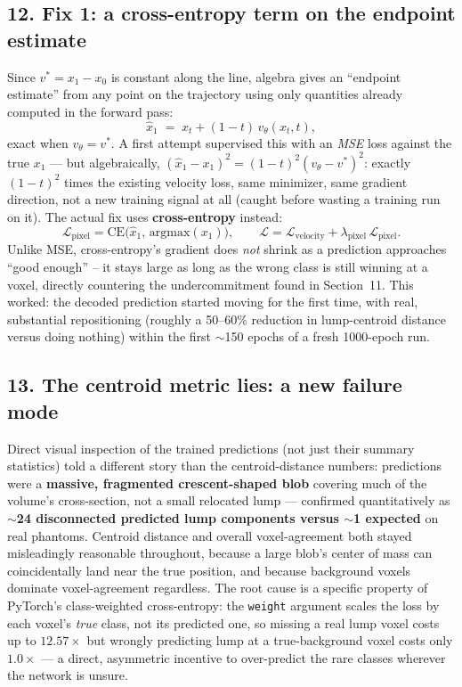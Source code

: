 \documentclass[11pt]{article}
\newcommand{\hsub}[1]{\subsection*{#1}}
\begin{document}
\hsub{12. Fix 1: a cross-entropy term on the endpoint estimate}
Since $v^* = x_1-x_0$ is constant along the line, algebra gives an ``endpoint estimate'' from
any point on the trajectory using only quantities already computed in the forward pass:
\begin{equation}
\hat x_1 \;=\; x_t + (1-t)\,v_\theta(x_t,t), \label{eq:endpoint-estimate}
\end{equation}
exact when $v_\theta = v^*$. A first attempt supervised this with an \emph{MSE} loss against
the true $x_1$ --- but algebraically, $(\hat x_1 - x_1)^2 = (1-t)^2(v_\theta - v^*)^2$: exactly
$(1-t)^2$ times the existing velocity loss, same minimizer, same gradient direction, not a new
training signal at all (caught before wasting a training run on it). The actual fix uses
\textbf{cross-entropy} instead:
\begin{equation}
\mathcal{L}_{\text{pixel}} = \text{CE}\big(\hat x_1,\, \text{argmax}(x_1)\big), \qquad
\mathcal{L} = \mathcal{L}_{\text{velocity}} + \lambda_{\text{pixel}}\,\mathcal{L}_{\text{pixel}}.
\label{eq:pixel-loss}
\end{equation}
Unlike MSE, cross-entropy's gradient does \emph{not} shrink as a prediction approaches
``good enough'' -- it stays large as long as the wrong class is still winning at a voxel,
directly countering the undercommitment found in Section~11. This worked: the decoded
prediction started moving for the first time, with real, substantial repositioning (roughly a
50--60\% reduction in lump-centroid distance versus doing nothing) within the first $\sim$150
epochs of a fresh 1000-epoch run.

\hsub{13. The centroid metric lies: a new failure mode}
Direct visual inspection of the trained predictions (not just their summary statistics) told
a different story than the centroid-distance numbers: predictions were a \textbf{massive,
fragmented crescent-shaped blob} covering much of the volume's cross-section, not a small
relocated lump --- confirmed quantitatively as \textbf{$\sim$24 disconnected predicted lump
components versus $\sim$1 expected} on real phantoms. Centroid distance and overall
voxel-agreement both stayed misleadingly reasonable throughout, because a large blob's center
of mass can coincidentally land near the true position, and because background voxels
dominate voxel-agreement regardless. The root cause is a specific property of PyTorch's
class-weighted cross-entropy: the \texttt{weight} argument scales the loss by each voxel's
\emph{true} class, not its predicted one, so missing a real lump voxel costs up to
$12.57\times$ but wrongly predicting lump at a true-background voxel costs only $1.0\times$
--- a direct, asymmetric incentive to over-predict the rare classes wherever the network is
unsure.
\end{document}
